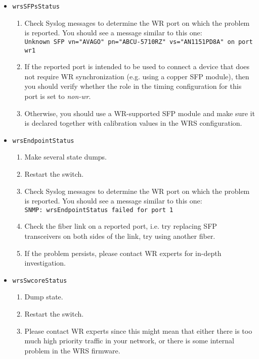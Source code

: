 \begin{itemize}
  \item \texttt{wrsSFPsStatus}
    \begin{enumerate}
      \item Check Syslog messages to determine the WR port on which the problem
        is reported. You should see a message similar to this one:\\
        \texttt{Unknown SFP vn="AVAGO" pn="ABCU-5710RZ" vs="AN1151PD8A" on port
        wr1}
      \item If the reported port is intended to be used to connect a device that
        does not require WR synchronization (e.g. using a copper SFP module),
        then you should verify whether the role in the timing configuration for
        this port is set to \emph{non-wr}.
      \item Otherwise, you should use a WR-supported SFP module and make sure it
        is declared together with calibration values in the WRS configuration.
    \end{enumerate}

  \item \texttt{wrsEndpointStatus}
    \begin{enumerate}
      \item Make several state dumps.
      \item Restart the switch.
      \item Check Syslog messages to determine the WR port on which the problem
        is reported. You should see a message similar to this one:\\
        \texttt{SNMP: wrsEndpointStatus failed for port 1}
      \item Check the fiber link on a reported port, i.e. try replacing SFP
        transceivers on both sides of the link, try using another fiber.
      \item If the problem persists, please contact WR experts for in-depth
        investigation.
    \end{enumerate}

  \item \texttt{wrsSwcoreStatus}
    \begin{enumerate}
      \item Dump state.
      \item Restart the switch.
      \item Please contact WR experts since this might mean that either there is
        too much high priority traffic in your network, or there is some
        internal problem in the WRS firmware.
    \end{enumerate}


\end{itemize}

